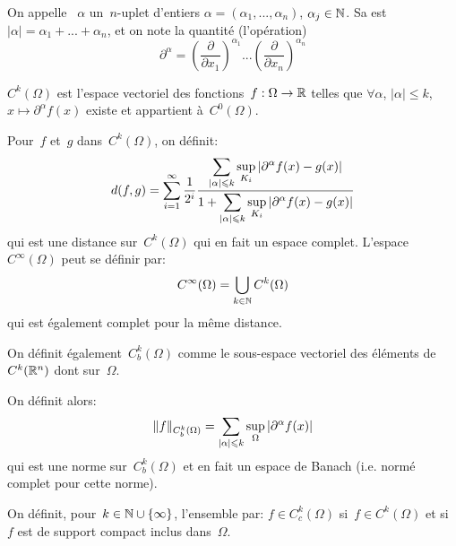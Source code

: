 \medskip
\begin{definition}
On appelle ~$\alpha$ un~$n$-uplet d'entiers $\alpha=(\alpha_1, ..., \alpha_n)$, $\alpha_j\in\mathbb N$.
Sa  est~$|\alpha|=\alpha_1+ ... + \alpha_n$, et on note  la quantité (l'opération)
\begin{equation}
   \partial^\alpha=\left(\dfrac{\partial}{\partial x_1}\right)^{\alpha_1}...\left(\dfrac{\partial}{\partial x_n}\right)^{\alpha_n}\end{equation}
\end{definition}

\medskip{}
$C^k(\Omega)$ est l'espace vectoriel des fonctions~$f: \Omega \to \mathbb R$ telles que $\forall \alpha$, $|\alpha|\le k$, $x\mapsto \partial^\alpha f(x)$ existe et appartient à~$C^0(\Omega)$.

Pour~$f$ et~$g$ dans~$C^k(\Omega)$, on définit:
\begin{equation}
d(f,g)=\dsum_{i=1}^\infty \dfrac1{2^i}\dfrac{\dsum_{|\alpha|\le k} \sup_{K_i}|\partial^\alpha f(x)-g(x)|}{%
1+\dsum_{|\alpha|\le k} \sup_{K_i}|\partial^\alpha f(x)-g(x)|}
\end{equation}
qui est une distance sur~$C^k(\Omega)$ qui en fait un espace complet. L'espace~$C^\infty(\Omega)$ peut se définir par:
\begin{equation} C^\infty(\Omega)=\bigcup\limits_{k\in\mathbb N}C^k(\Omega)\end{equation}
qui est également complet pour la même distance.

\bigskip{}
On définit également~$C^k_b(\Omega)$ comme le sous-espace vectoriel des éléments de~$C^k(\mathbb R^n)$ dont  sur~$\Omega$.

On définit alors:
\begin{equation}
\|f\|_{C^k_b(\Omega)}=\displaystyle\sum_{|\alpha|\leqslant k} \sup_{\Omega} |\partial^\alpha f(x)|
\end{equation}
qui est une norme sur~$C^k_b(\Omega)$ et en fait un espace de Banach (i.e. normé complet pour cette norme).

\medskip
\begin{definition}\label{Def-Cc}
On définit, pour~$k\in\mathbb N\cup\{\infty\}$, l'ensemble  par:
$f\in C_c^k(\Omega)$ si~$f\in C^k(\Omega)$ et si~$f$ est de support compact inclus dans~$\Omega$.
\end{definition}

